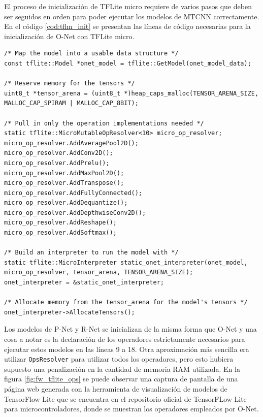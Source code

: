 El proceso de inicialización de TFLite micro requiere de varios pasos que deben ser seguidos en orden para poder ejecutar los modelos de MTCNN correctamente. En el código \ref{cod:tflm_init} se presentan las líneas de código necesarias para la inicialización de O-Net con TFLite micro.

\begin{lstlisting}[label=cod:tflm_init,caption=Código para inicializar O-Net con TFLite micro.]
/* Map the model into a usable data structure */
const tflite::Model *onet_model = tflite::GetModel(onet_model_data);

/* Reserve memory for the tensors */
uint8_t *tensor_arena = (uint8_t *)heap_caps_malloc(TENSOR_ARENA_SIZE, MALLOC_CAP_SPIRAM | MALLOC_CAP_8BIT);

/* Pull in only the operation implementations needed */
static tflite::MicroMutableOpResolver<10> micro_op_resolver;
micro_op_resolver.AddAveragePool2D();
micro_op_resolver.AddConv2D();
micro_op_resolver.AddPrelu();
micro_op_resolver.AddMaxPool2D();
micro_op_resolver.AddTranspose();
micro_op_resolver.AddFullyConnected();
micro_op_resolver.AddDequantize();
micro_op_resolver.AddDepthwiseConv2D();
micro_op_resolver.AddReshape();
micro_op_resolver.AddSoftmax();

/* Build an interpreter to run the model with */
static tflite::MicroInterpreter static_onet_interpreter(onet_model, micro_op_resolver, tensor_arena, TENSOR_ARENA_SIZE);
onet_interpreter = &static_onet_interpreter;

/* Allocate memory from the tensor_arena for the model's tensors */
onet_interpreter->AllocateTensors();
\end{lstlisting}

Los modelos de P-Net y R-Net se inicializan de la misma forma que O-Net y una cosa a notar es la declaración de los operadores estrictamente necesarios para ejecutar estos modelos en las líneas 9 a 18. Otra aproximación más sencilla era utilizar \texttt{OpsResolver} para utilizar todos los operadores, pero esto hubiera supuesto una penalización en la cantidad de memoria RAM utilizada. En la figura \ref{fig:fw_tflite_ops} se puede observar una captura de pantalla de una página web generada con la herramienta de visualización de modelos de TensorFlow Lite que se encuentra en el repositorio oficial de TensorFLow Lite para microcontroladores\cite{tflm_repo}, donde se muestran los operadores empleados por O-Net.

